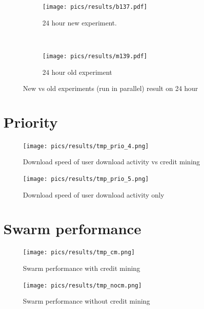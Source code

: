 \begin{figure}[t!]
	\begin{adjustwidth}{-2.5cm}{}
		\begin{subfigure}[t]{0.7\textwidth}
			\centering
			\texttt{[image: pics/results/b137.pdf]}
			\caption{24 hour new experiment.}
		\end{subfigure}
		~
		\begin{subfigure}[t]{0.7\textwidth}
			\centering
			\texttt{[image: pics/results/m139.pdf]}
			\caption{24 hour old experiment}
		\end{subfigure}
		\caption{New vs old experiments (run in parallel) result on 24 hour}
	\end{adjustwidth}
\end{figure}

\section{Priority}
\begin{figure}[h]
	\centering
	\texttt{[image: pics/results/tmp\_prio\_4.png]}
	\caption{Download speed of user download activity vs credit mining}
	\label{fig:cmpriomeanagg}
\end{figure}
\begin{figure}[h]
	\centering
	\texttt{[image: pics/results/tmp\_prio\_5.png]}
	\caption{Download speed of user download activity only}
	\label{fig:cmpriomean}
\end{figure}
\section{Swarm performance}
\begin{figure}[h]
	\centering
	\texttt{[image: pics/results/tmp\_cm.png]}
	\caption{Swarm performance with credit mining}
	\label{fig:swarmcmperf}
\end{figure}

\begin{figure}[h]
	\centering
	\texttt{[image: pics/results/tmp\_nocm.png]}
	\caption{Swarm performance without credit mining}
	\label{fig:swarmnocmperfrecent}
\end{figure}